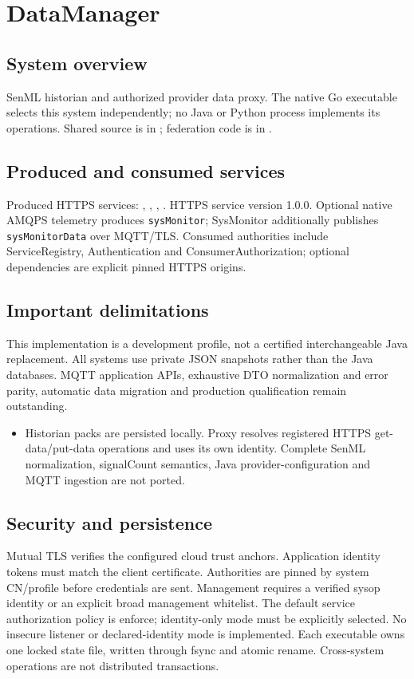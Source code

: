 \documentclass[a4paper]{arrowhead}
\begin{document}
\ArrowheadSetup
\section{DataManager}
\subsection{System overview}
SenML historian and authorized provider data proxy. The native Go executable selects this system independently; no Java or Python process implements its operations. Shared source is in ; federation code is in .
\subsection{Produced and consumed services}
Produced HTTPS services: , \allowbreak {}, \allowbreak {}, \allowbreak {}.
HTTPS service version 1.0.0. Optional native AMQPS telemetry produces \texttt{sysMonitor}; SysMonitor additionally publishes \texttt{sysMonitorData} over MQTT/TLS. Consumed authorities include ServiceRegistry, Authentication and ConsumerAuthorization; optional dependencies are explicit pinned HTTPS origins.
\subsection{Important delimitations}
This implementation is a development profile, not a certified interchangeable Java replacement. All systems use private JSON snapshots rather than the Java databases. MQTT application APIs, exhaustive DTO normalization and error parity, automatic data migration and production qualification remain outstanding.
\begin{itemize}
\item Historian packs are persisted locally. Proxy resolves registered HTTPS get-data/put-data operations and uses its own identity. Complete SenML normalization, signalCount semantics, Java provider-configuration and MQTT ingestion are not ported.
\end{itemize}
\subsection{Security and persistence}
Mutual TLS verifies the configured cloud trust anchors. Application identity tokens must match the client certificate. Authorities are pinned by system CN/profile before credentials are sent. Management requires a verified sysop identity or an explicit broad management whitelist. The default service authorization policy is enforce; identity-only mode must be explicitly selected. No insecure listener or declared-identity mode is implemented. Each executable owns one locked state file, written through fsync and atomic rename. Cross-system operations are not distributed transactions.
\end{document}
